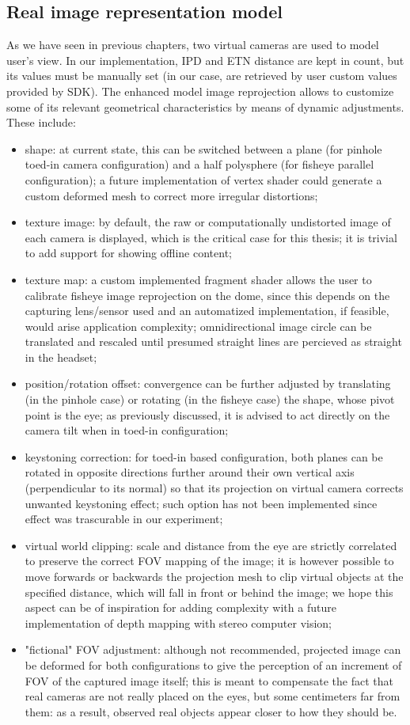 \subsection{Real image representation model}
As we have seen in previous chapters, two virtual cameras are used to model user’s view. In our implementation, IPD and ETN distance are kept in count, but its values must be manually set (in our case, are retrieved by user custom values provided by SDK). The enhanced model image reprojection allows to customize some of its relevant geometrical characteristics by means of dynamic adjustments. These include:
\begin{itemize}
\item shape: at current state, this can be switched between a plane (for pinhole toed-in camera configuration) and a half polysphere (for fisheye parallel configuration); a future implementation of vertex shader could generate a custom deformed mesh to correct more irregular distortions;
\item texture image: by default, the raw or computationally undistorted image of each camera is displayed, which is the critical case for this thesis; it is trivial to add support for showing offline content;
\item texture map: a custom implemented fragment shader allows the user to calibrate fisheye image reprojection on the dome, since this depends on the capturing lens/sensor used and an automatized implementation, if feasible, would arise application complexity; omnidirectional image circle can be translated and rescaled until presumed straight lines are percieved as straight in the headset;
\item position/rotation offset: convergence can be further adjusted by translating (in the pinhole case) or rotating (in the fisheye case) the shape, whose pivot point is the eye; as previously discussed, it is advised to act directly on the camera tilt when in toed-in configuration;
\item keystoning correction: for toed-in based configuration, both planes can be rotated in opposite directions further around their own vertical axis (perpendicular to its normal) so that its projection on virtual camera corrects unwanted keystoning effect; such option has not been implemented since effect was trascurable in our experiment;
\item virtual world clipping: scale and distance from the eye are strictly correlated to preserve the correct FOV mapping of the image; it is however possible to move forwards or backwards the projection mesh to clip virtual objects at the specified distance, which will fall in front or behind the image; we hope this aspect can be of inspiration for adding complexity with a future implementation of depth mapping with stereo computer vision;
\item "fictional" FOV adjustment: although not recommended, projected image can be deformed for both configurations to give the perception of an increment of FOV of the captured image itself; this is meant to compensate the fact that real cameras are not really placed on the eyes, but some centimeters far from them: as a result, observed real objects appear closer to how they should be.


\end{itemize}
